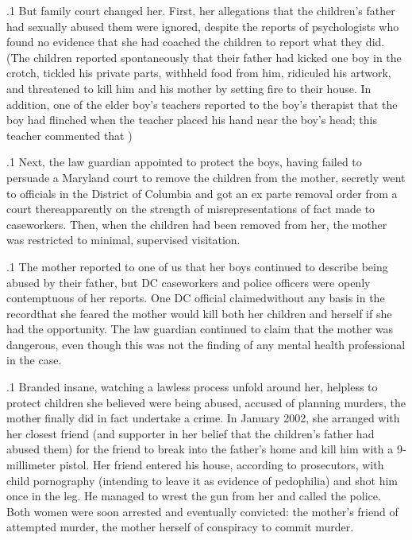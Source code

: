 \documentclass[11pt, twoside]{article}
\begin{document}
{\p.1{%
But family court changed her. First, her allegations that the children’s
father had sexually abused them were ignored, despite the reports of psychologists who found no evidence that she had coached the children to
report what they did. (The children reported spontaneously that their father had kicked one boy in the crotch, tickled his private parts, withheld
food from him, ridiculed his artwork, and threatened to kill him and his
mother by setting fire to their house. In addition, one of the elder boy’s
teachers reported to the boy’s therapist that the boy had flinched when
the teacher placed his hand near the boy’s head; this teacher commented
that )
}%

\p.1{%
Next, the law guardian appointed to protect the boys, having failed
to persuade a Maryland court to remove the children from the mother,
secretly went to officials in the District of Columbia and got an ex parte
removal order from a court there\mdash{}apparently on the strength of misrepresentations of fact made to caseworkers. Then, when the children
had been removed from her, the mother was restricted to minimal,
supervised visitation.
}%

\p.1{%
The mother reported to one of us that her boys continued to describe
being abused by their father, but DC caseworkers and police officers were
openly contemptuous of her reports. One DC official
claimed\mdash{}without any basis in the record\mdash{}that she feared the mother
would kill both her children and herself if she had the opportunity. The
law guardian continued to claim that the mother was dangerous, even
though this was not the finding of any mental health professional in the
case.
}%

\p.1{%
Branded insane, watching a lawless process unfold around her, helpless to protect children she believed were being abused, accused of
planning murders, the mother finally did in fact undertake a crime. In
January 2002, she arranged with her closest friend (and supporter in
her belief that the children’s father had abused them) for the friend to
break into the father’s home and kill him with a 9-millimeter pistol. Her
friend entered his house, according to prosecutors, with child pornography (intending to leave it as evidence of pedophilia) and shot him once
in the leg. He managed to wrest the gun from her and called the police.
Both women were soon arrested and eventually convicted: the mother’s
friend of attempted murder, the mother herself of conspiracy to commit
murder.
}%

}
\end{document}
